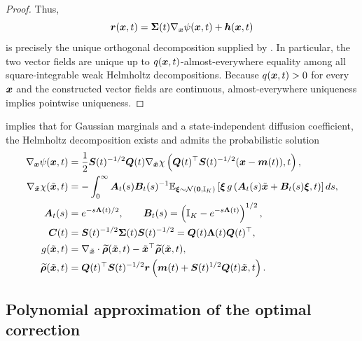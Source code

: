 \begin{proof}
Thus,
\begin{equation*}
\boldsymbol{r}(\boldsymbol{x},t) = \boldsymbol{\Sigma}(t)\nabla_{\boldsymbol{x}}\psi(\boldsymbol{x},t) + \boldsymbol{h}(\boldsymbol{x},t)
\end{equation*}
is precisely the unique orthogonal decomposition supplied by . 
In particular, the two vector fields are unique up to $q(\boldsymbol{x},t)$-almost-everywhere equality among all square-integrable weak Helmholtz decompositions. 
Because $q(\boldsymbol{x},t) > 0$ for every $\boldsymbol{x}$ and the constructed vector fields are continuous, almost-everywhere uniqueness implies pointwise uniqueness.
\end{proof}

 implies that for Gaussian marginals and a state-independent diffusion coefficient, the Helmholtz decomposition exists and admits the probabilistic solution
\begin{equation}\label{app:eq:prob-rep}
\begin{aligned}
    \nabla_{\boldsymbol{x}}\psi(\boldsymbol{x},t)
    &=
    \frac{1}{2}\boldsymbol{S}(t)^{-1/2}\boldsymbol{Q}(t)
    \nabla_{\tilde{\boldsymbol{x}}}\chi\left(
        \boldsymbol{Q}(t)^\top\boldsymbol{S}(t)^{-1/2}(\boldsymbol{x}-\boldsymbol{m}(t)),t
    \right),\\
    \nabla_{\tilde{\boldsymbol{x}}}\chi(\tilde{\boldsymbol{x}},t)
    &=
    -\int_0^\infty
    \boldsymbol{A}_t(s)\boldsymbol{B}_t(s)^{-1}
    \mathbb{E}_{\boldsymbol{\xi}\sim\mathcal{N}(\boldsymbol{0},\mathbb{I}_K)}
    \left[
        \boldsymbol{\xi}\,
        g\left(
            \boldsymbol{A}_t(s)\tilde{\boldsymbol{x}}+
            \boldsymbol{B}_t(s)\boldsymbol{\xi},t
        \right)
    \right]ds,\\
    \boldsymbol{A}_t(s)
    &=
    e^{-s\boldsymbol{\Lambda}(t)/2},
    \qquad
    \boldsymbol{B}_t(s)
    =
    \left(\mathbb{I}_K-e^{-s\boldsymbol{\Lambda}(t)}\right)^{1/2},\\
    \boldsymbol{C}(t)
    &=
    \boldsymbol{S}(t)^{-1/2}\boldsymbol{\Sigma}(t)\boldsymbol{S}(t)^{-1/2}
    =
    \boldsymbol{Q}(t)\boldsymbol{\Lambda}(t)\boldsymbol{Q}(t)^\top,\\
    g(\tilde{\boldsymbol{x}},t)
    &=
    \nabla_{\tilde{\boldsymbol{x}}}\cdot
    \widetilde{\boldsymbol{\rho}}(\tilde{\boldsymbol{x}},t)
    -
    \tilde{\boldsymbol{x}}^\top\widetilde{\boldsymbol{\rho}}(\tilde{\boldsymbol{x}},t),\\
    \widetilde{\boldsymbol{\rho}}(\tilde{\boldsymbol{x}},t)
    &=
    \boldsymbol{Q}(t)^\top\boldsymbol{S}(t)^{-1/2}
    \boldsymbol{r}\left(
        \boldsymbol{m}(t)+\boldsymbol{S}(t)^{1/2}\boldsymbol{Q}(t)\tilde{\boldsymbol{x}},t
    \right).
\end{aligned}
\end{equation}

\subsection{Polynomial approximation of the optimal correction}
\label{app:subsec:resid-approx}

